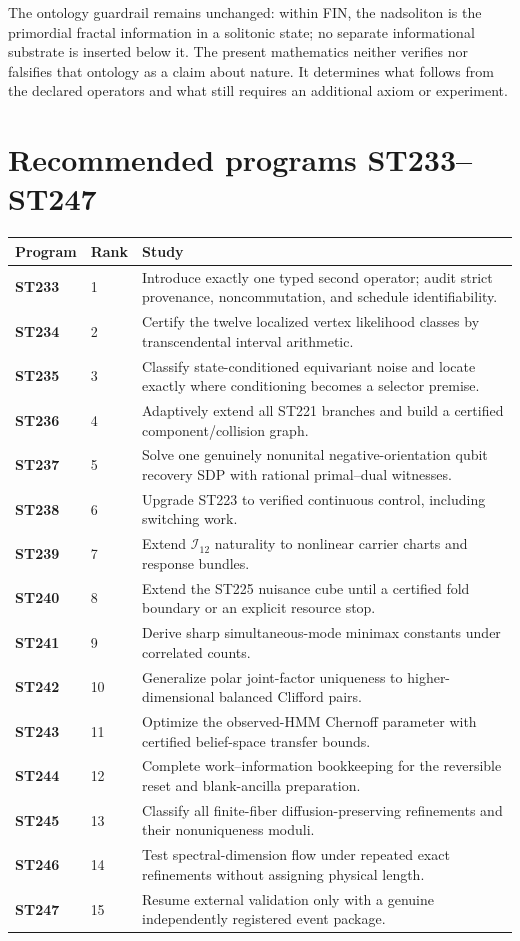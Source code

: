 \documentclass[11pt,a4paper]{article}
\begin{document}
The ontology guardrail remains unchanged: within FIN, the nadsoliton is the primordial
fractal information in a solitonic state; no separate informational substrate is inserted
below it. The present mathematics neither verifies nor falsifies that ontology as a claim
about nature. It determines what follows from the declared operators and what still requires
an additional axiom or experiment.

\section{Recommended programs ST233--ST247}

\small
\begin{longtable}{>{\bfseries}p{}p{}p{}}
\toprule
Program & Rank & Study\\
\midrule
\endhead
ST233&1&Introduce exactly one typed second operator; audit strict provenance, noncommutation, and schedule identifiability.\\
ST234&2&Certify the twelve localized vertex likelihood classes by transcendental interval arithmetic.\\
ST235&3&Classify state-conditioned equivariant noise and locate exactly where conditioning becomes a selector premise.\\
ST236&4&Adaptively extend all ST221 branches and build a certified component/collision graph.\\
ST237&5&Solve one genuinely nonunital negative-orientation qubit recovery SDP with rational primal--dual witnesses.\\
ST238&6&Upgrade ST223 to verified continuous control, including switching work.\\
ST239&7&Extend $\mathcal I_{12}$ naturality to nonlinear carrier charts and response bundles.\\
ST240&8&Extend the ST225 nuisance cube until a certified fold boundary or an explicit resource stop.\\
ST241&9&Derive sharp simultaneous-mode minimax constants under correlated counts.\\
ST242&10&Generalize polar joint-factor uniqueness to higher-dimensional balanced Clifford pairs.\\
ST243&11&Optimize the observed-HMM Chernoff parameter with certified belief-space transfer bounds.\\
ST244&12&Complete work--information bookkeeping for the reversible reset and blank-ancilla preparation.\\
ST245&13&Classify all finite-fiber diffusion-preserving refinements and their nonuniqueness moduli.\\
ST246&14&Test spectral-dimension flow under repeated exact refinements without assigning physical length.\\
ST247&15&Resume external validation only with a genuine independently registered event package.\\
\bottomrule
\end{longtable}
\normalsize
\end{document}
